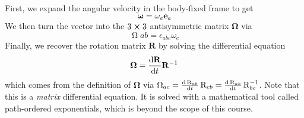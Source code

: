\documentclass[11pt, a4paper]{article}
\newcommand{\e}{\mathbf{e}} %
\newcommand{\mat}[1]{\mathbf{#1}} %
\begin{document}
\begin{itemize}
	First, we expand the angular velocity in the body-fixed frame to get
	\begin{equation*}
		\bm{\omega} = \omega_{a} \e_{a}
	\end{equation*}
	We then turn the vector into the $ 3 \cross 3 $ antisymmetric matrix $ \mat{\Omega} $ via
	\begin{equation*}
		\operatorname{\Omega}ab = \epsilon_{abc}\omega_{c}
	\end{equation*}
	Finally, we recover the rotation matrix $ \mat{R} $ by solving the differential equation
	\begin{equation*}
		\mat{\Omega} = \dv{\mat{R}}{t} \mat{R}^{-1}
	\end{equation*}
	which comes from the definition of $ \mat{\Omega} $ via $ \operatorname{\Omega}_{ac} = \dv{\operatorname{R}_{ab}}{t} \operatorname{R}_{cb} = \dv{\operatorname{R}_{ab}}{t} \operatorname{R}_{bc}^{-1} $. Note that this is a \textit{matrix} differential equation. It is solved with a mathematical tool called path-ordered exponentials, which is beyond the scope of this course.
	
\end{itemize}
\end{document}
